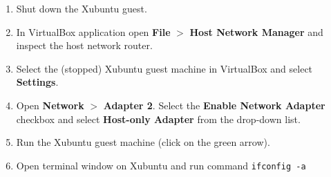 \documentclass[11pt,a4paper]{article}
\begin{document}
\begin{enumerate}
\item Shut down the Xubuntu guest. 
\item In VirtualBox application open {\bf File} $>$ {\bf Host Network Manager} and 
inspect the host network router.\\
\item Select the (stopped) Xubuntu guest machine in VirtualBox and select {\bf Settings}.\\
\item Open {\bf Network} $>$ {\bf Adapter 2}. Select the {\bf Enable Network Adapter} checkbox
and select {\bf Host-only Adapter} from the drop-down list.\\
\item Run the Xubuntu guest machine (click on the green arrow).
\item Open terminal window on Xubuntu and run command {\tt ifconfig -a}\\

\end{enumerate}
\end{document}
